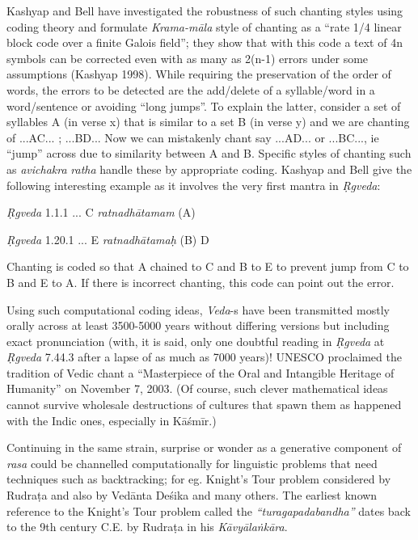 Kashyap and Bell have investigated the robustness of such chanting styles using coding theory and formulate \textsl{Krama-māla} style of chanting as a “rate 1/4 linear block code over a finite Galois field”; they show that with this code a text of 4n symbols can be corrected even with as many as 2(n-1) errors under some assumptions (Kashyap 1998). While requiring the preservation of the order of words, the errors to be detected are the add/delete of a syllable/word in a word/sentence or avoiding “long jumps”. To explain the latter, consider a set of syllables A (in verse x) that is similar to a set B (in verse y) and we are chanting of  ...AC... ; ...BD... Now we can mistakenly chant say ...AD... or ...BC..., ie “jump” across due to similarity between A and B. Specific styles of chanting such as \textsl{avichakra} \textsl{ratha} handle these by appropriate coding. Kashyap and Bell give the following interesting example as it involves the very first mantra in \textsl{Ṛgveda}:

\smallskip
\begin{myquote}
\textsl{Ṛgveda} 1.1.1     ... C \textsl{ratnadhātamam} (A)

\textsl{Ṛgveda} 1.20.1    ... E \textsl{ratnadhātamaḥ} (B) D
\end{myquote}
\smallskip

Chanting is coded so that A chained to C and B to E to prevent jump from C to B and E to A. If there is incorrect chanting, this code can point out the error. 

Using such computational coding ideas, \textsl{Veda}-s have been transmitted mostly orally across at least 3500-5000 years without differing versions but including exact pronunciation (with, it is said, only one doubtful reading in \textsl{Ṛgveda} at \textsl{Ṛgveda} 7.44.3 after a lapse of as much as 7000 years)! UNESCO proclaimed the tradition of Vedic chant a “Masterpiece of the Oral and Intangible Heritage of Humanity” on November 7, 2003. (Of course, such clever mathematical ideas cannot survive wholesale destructions of cultures that spawn them as happened with the Indic ones, especially in Kāśmīr.)

Continuing in the same strain, surprise or wonder as a generative component of \textsl{rasa} could be channelled computationally for linguistic problems that need techniques such as backtracking; for eg. Knight’s Tour problem considered by Rudraṭa and also by Vedānta Deśika and many others. The earliest known reference to the Knight's Tour problem called the \textsl{``turagapadabandha''} dates back to the 9th century C.E. by Rudraṭa in his \textsl{Kāvyālaṅkāra}.

